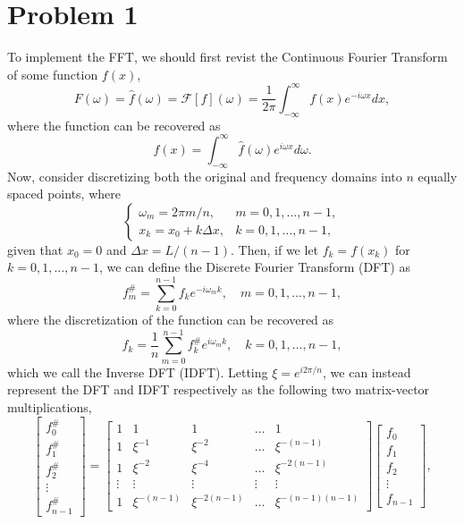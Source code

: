 \documentclass[11pt]{article}
\begin{document}
\section{Problem 1}
To implement the FFT, we should first revist the Continuous Fourier Transform of some function $f(x)$,
	\begin{equation*}
		F(\omega) = \hat{f}(\omega) = \mathcal{F}\left[f\right](\omega) = \frac{1}{2\pi}\int_{-\infty}^{\infty}{f(x)e^{-i\omega x}dx},
	\end{equation*}
where the function can be recovered as
	\begin{equation*}
		f(x) = \int_{-\infty}^{\infty}{\hat{f}(\omega)e^{i\omega x}d\omega}.
	\end{equation*}
Now, consider discretizing both the original and frequency domains into $n$ equally spaced points, where
	\begin{equation}
		\begin{cases}
			\omega_m = 2\pi m/n, & m = 0,1,\dots,n-1, \\
			x_k = x_0 + k\Delta x, & k = 0,1,\dots,n-1,
		\end{cases}
			\label{eq:5}
	\end{equation}
given that $x_0 = 0$ and $\Delta x = L/(n-1)$. Then, if we let $f_k = f(x_k)$ for $k = 0,1,\dots,n-1$,
we can define the Discrete Fourier Transform (DFT) as
	\begin{equation*}
		f_{m}^{\#} = \sum_{k=0}^{n-1}{f_ke^{-i\omega_mk}}, \quad m = 0,1,\dots,n-1,
	\end{equation*}
where the discretization of the function can be recovered as
	\begin{equation*}
		f_{k} = \frac{1}{n}\sum_{m=0}^{n-1}{f_{k}^{\#}e^{i\omega_mk}}, \quad k = 0,1,\dots,n-1,
	\end{equation*}
which we call the Inverse DFT (IDFT). Letting $\xi = e^{i 2\pi/n}$, we can instead represent the DFT and
IDFT respectively as the following two matrix-vector multiplications,
\begin{equation*}
	\begin{bmatrix}
		f_{0}^{\#} \\
		f_{1}^{\#} \\
		f_{2}^{\#} \\
		\vdots \\
		f_{n-1}^{\#}
	\end{bmatrix}
	=
	\begin{bmatrix}
		1 & 1 & 1 & \dots & 1 \\
		1 & \xi^{-1} & \xi^{-2} & \dots & \xi^{-(n-1)} \\
		1 & \xi^{-2} & \xi^{-4} & \dots & \xi^{-2(n-1)} \\
		\vdots & \vdots & \vdots & \vdots & \vdots \\
		1 & \xi^{-(n-1)} & \xi^{-2(n-1)} & \dots & \xi^{-(n-1)(n-1)} 
	\end{bmatrix}
	\begin{bmatrix}
		f_{0} \\
		f_{1} \\
		f_{2} \\
		\vdots \\
		f_{n-1}
	\end{bmatrix},
\end{equation*}
\end{document}
